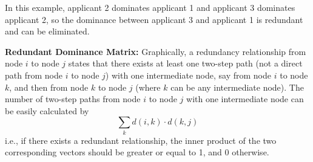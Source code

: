 \documentclass[12pt,english]{report}
\begin{document}
\begin{figure}
	\begin{floatrow}
	\capbtabbox{%
		\begin{tabular}{l|llllll}
			& 1 & 2 & 3 & 4 & 5 & 6 \\ \hline
			1 & 0 & 0 & 0 & 0 & 0 & 0 \\
			2 & 1 & 0 & 0 & 1 & 1 & 0 \\
			3 & 1 & 1 & 0 & 1 & 1 & 0 \\
			4 & 0 & 0 & 0 & 0 & 0 & 0 \\
			5 & 0 & 0 & 0 & 0 & 0 & 0 \\
			6 & 1 & 1 & 0 & 1 & 1 & 0 \\
		\end{tabular}%
	}{%
	\caption{Full Dominance relation in Matrix Form}%
	\label{full_domin}
}
\end{floatrow}
\end{figure}









In this example, applicant 2 dominates applicant 1 and applicant 3 dominates applicant 2, so the dominance between applicant 3 and applicant 1 is redundant and can be eliminated.  

\vspace{0.1in}
\textbf{Redundant Dominance Matrix:}  Graphically, a redundancy relationship from node $i$ to node $j$ states that there exists at least one two-step path (not a direct path from node $i$ to node $j$) with one intermediate node, say from node $i$ to node $k$, and then from node $k$ to node $j$ (where $k$ can be any intermediate node).  The number of two-step paths from node $i$ to node $j$ with one intermediate node can be easily calculated by 
$$ \sum_k d(i,k) \cdot  d(k,j)$$
i.e., if there exists a redundant relationship, the inner product of the two corresponding vectors should be greater or equal to 1, and 0 otherwise.  
\end{document}
